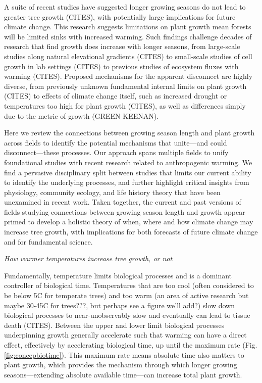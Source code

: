 \documentclass[11pt]{article}
\begin{document}
A suite of recent studies have suggested longer growing seasons do not lead to greater tree growth (CITES), with potentially large implications for future climate change. This research suggests limitations on plant growth mean forests will be limited sinks with increased warming. Such findings challenge decades of research that find growth does increase with longer seasons, from large-scale studies along natural elevational gradients (CITES) to small-scale studies of cell growth in lab settings (CITES) to previous studies of ecosystem fluxes with warming (CITES). Proposed mechanisms for the apparent disconnect are highly diverse, from previously unknown fundamental internal limits on plant growth (CITES) to effects of climate change itself, such as increased drought or temperatures too high for plant growth (CITES), as well as differences simply due to the metric of growth (GREEN KEENAN).

Here we review the connections between growing season length and plant growth across fields to identify the potential mechanisms that unite---and could disconnect---these processes. Our approach spans multiple fields to unify foundational studies with recent research related to anthropogenic warming. We find a pervasive disciplinary split between studies that limits our current ability to identify the underlying processes, and further highlight critical insights from physiology, community ecology, and life history theory that have been unexamined in recent work. Taken together, the current and past versions of fields studying connections between growing season length and growth appear primed to develop a holistic theory of when, where and how climate change may increase tree growth, with implications for both forecasts of future climate change and for fundamental science.

\emph{How warmer temperatures increase tree growth, or not}

Fundamentally, temperature limits biological processes and is a dominant controller of biological time. Temperatures that are too cool (often considered to be below 5C for temperate trees) and too warm (an area of active research but maybe 30-45C for trees???, but perhaps see a figure we'll add?) slow down biological processes to near-unobservably slow and eventually can lead to tissue death (CITES). Between the upper and lower limit biological processes underpinning growth generally accelerate such that warming can have a direct effect, effectively by accelerating biological time, up until the maximum rate (Fig. \ref{fig:concepbiotime}). This maximum rate means absolute time also matters to plant growth, which provides the mechanism through which longer growing seasons---extending absolute available time---can increase total plant growth. %
 
\end{document}
